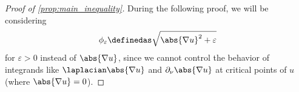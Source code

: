 \documentclass[titlepage,numbers=noenddot,oneside,%
cleardoublepage=empty,paper=a4,fontsize=11pt,%
english,%
]{scrartcl}
\newcommand*{\mathcomma}{\,,}
\newcommand*{\mathfullstop}{\,.}
\newcommand{\Ricci}{\mathrm{Ric}} %
\begin{document}
{        %
        
        \begin{proof}[Proof of \cref{prop:main_inequality}]
            During the following proof, we will be considering 
            \begin{equation*}
                \phi_\varepsilon\definedas \sqrt{\abs{\nabla u}^2+\varepsilon}
            \end{equation*}
            for \( \varepsilon>0 \) instead of \( \abs{\nabla u} \), since we cannot control the behavior of integrands like \( \laplacian \abs{\nabla u} \) and \( \partial_\nu \abs{\nabla u} \) at critical points of \( u \) (where \( \abs{\nabla u}=0 \)).
            

\end{proof}}
\end{document}
